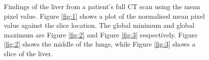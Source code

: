 \documentclass[12pt]{article}
\begin{document}
\begin{figure}
  \centering

  \hspace{1em}
  \caption{Findings of the liver from a patient's full CT scan using the mean pixel value. Figure \ref{fig:1} shows a plot of the normalised mean pixel value against the slice location. The global minimum and global maximum are Figure \ref{fig:2} and Figure \ref{fig:3} respectively. Figure \ref{fig:2} shows the middle of the lungs, while Figure \ref{fig:3} shows a slice of the liver. }
  \label{mean_pixel_value}
\end{figure}
\end{document}
